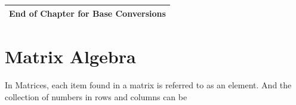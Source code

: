 \documentclass{article}
\begin{document}
\section*{}
\begin{table}[h!]
    \centering
    \begin{tabular}{|c|}
    \hline
        \textbf{End of Chapter for Base Conversions} \\
        \hline

        \hline
    \end{tabular}
    \label{tab:my_label}
\end{table}
\newpage
\section{Matrix Algebra}
\newline
In Matrices, each item found in a matrix is referred to as an element. And the collection of numbers in rows and columns can be 
\end{document}
